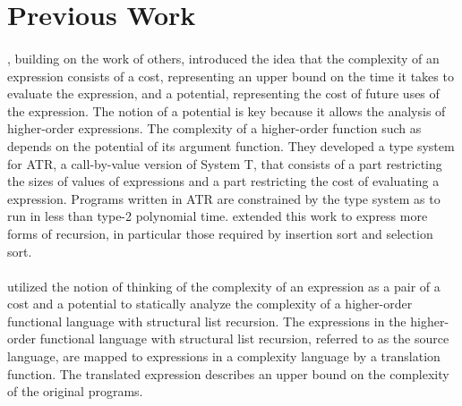 \section{Previous Work}

\paragraph{}
\citet{Danner2007}, building on the work of others, introduced the
idea that the complexity of an expression consists of a cost, representing an
upper bound on the time it takes to evaluate the expression, and a potential,
representing the cost of future uses of the expression.  The notion of a
potential is key because it allows the analysis of higher-order expressions.
The complexity of a higher-order function such as  depends on the
potential of its argument function.  They developed a type system for ATR, a
call-by-value version of System T, that consists of a part restricting the sizes of
values of expressions and a part restricting the cost of evaluating a
expression.  Programs written in ATR are constrained by the type system as to
run in less than type-2 polynomial time.  \citet{Danner2009} extended this work
to express more forms of recursion, in particular those required by insertion
sort and selection sort.

\paragraph{}
\citet{Danner2013} utilized the notion of thinking of the complexity of an
expression as a pair of a cost and a potential to statically analyze the
complexity of a higher-order functional language with structural list
recursion.  The expressions in the higher-order functional language with
structural list recursion, referred to as the source language, are mapped to
expressions in a complexity language by a translation function.  The translated
expression describes an upper bound on the complexity of the original programs.


